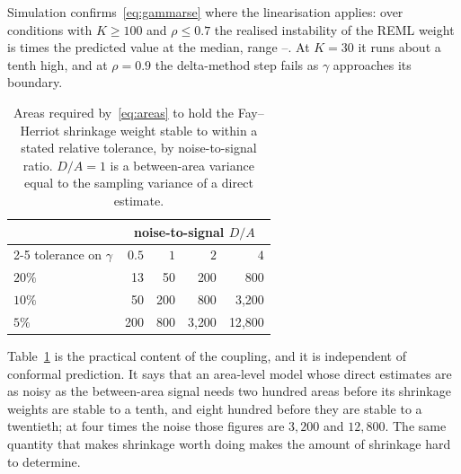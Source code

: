 Simulation confirms~\eqref{eq:gammarse} where the linearisation applies: over
conditions with $K\ge100$ and $\rho\le0.7$ the realised instability of the REML
weight is \GamRatioMed{} times the predicted value at the median, range
\GamRatioLo--\GamRatioHi. At $K=30$ it runs about a tenth high, and at
$\rho=0.9$ the delta-method step fails as $\gamma$ approaches its boundary.

\begin{table}[htbp]\centering
\caption{Areas required by~\eqref{eq:areas} to hold the Fay--Herriot shrinkage
weight stable to within a stated relative tolerance, by noise-to-signal ratio.
$D/A=1$ is a between-area variance equal to the sampling variance of a direct
estimate.}\label{tab:areas}
\begin{tabular}{lrrrr}\toprule
& \multicolumn{4}{c}{noise-to-signal $D/A$}\\\cmidrule(lr){2-5}
tolerance on $\gamma$ & $0.5$ & $1$ & $2$ & $4$\\\midrule
$20\%$ & 13 & 50 & 200 & 800\\
$10\%$ & 50 & 200 & 800 & 3{,}200\\
$5\%$ & 200 & 800 & 3{,}200 & 12{,}800\\
\bottomrule\end{tabular}
\end{table}

Table~\ref{tab:areas} is the practical content of the coupling, and it is
independent of conformal prediction. It says that an area-level model whose
direct estimates are as noisy as the between-area signal needs two hundred areas
before its shrinkage weights are stable to a tenth, and eight hundred before
they are stable to a twentieth; at four times the noise those figures are
$3{,}200$ and $12{,}800$. The same quantity that makes shrinkage worth doing
makes the amount of shrinkage hard to determine.
